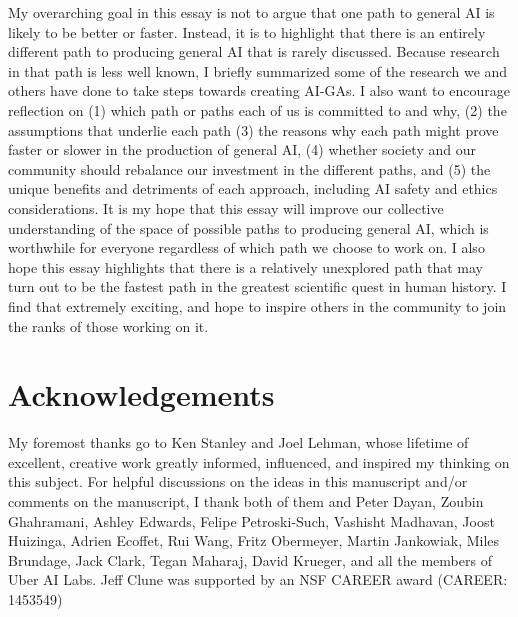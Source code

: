 \documentclass{article}
\begin{document}
My overarching goal in this essay is not to argue that one path to general AI is likely to be better or faster. Instead, it is to highlight that there is an entirely different path to producing general AI that is rarely discussed. Because research in that path is less well known, I briefly summarized some of the research we and others have done to take steps towards creating AI-GAs. I also want to encourage reflection on (1) which path or paths each of us is committed to and why, (2)  the assumptions that underlie each path (3) the reasons why each path might prove faster or slower in the production of general AI, (4) whether society and our community should rebalance our investment in the different paths, and (5) the unique benefits and detriments of each approach, including AI safety and ethics considerations. It is my hope that this essay will improve our collective understanding of the space of possible paths to producing general AI, which is worthwhile for everyone regardless of which path we choose to work on. I also hope this essay highlights that there is a relatively unexplored path that may turn out to be the fastest path in the greatest scientific quest in human history. I find that extremely exciting, and hope to inspire others in the community to join the ranks of those working on it. 

 
\section*{Acknowledgements}
My foremost thanks go to Ken Stanley and Joel Lehman, whose lifetime of excellent, creative work greatly informed, influenced, and inspired my thinking on this subject. For helpful discussions on the ideas in this manuscript and/or comments on the manuscript, I thank both of them and Peter Dayan, Zoubin Ghahramani, Ashley Edwards, Felipe Petroski-Such, Vashisht Madhavan, Joost Huizinga, Adrien Ecoffet, Rui Wang, Fritz Obermeyer, Martin Jankowiak, Miles Brundage, Jack Clark, Tegan Maharaj, David Krueger, and all the members of Uber AI Labs. Jeff Clune was supported by an NSF CAREER award (CAREER: 1453549)



\end{document}
